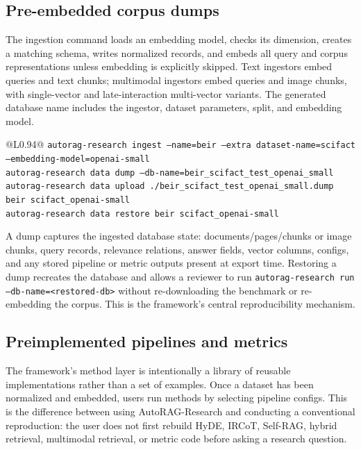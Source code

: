 \documentclass{article}
\newcommand{\framework}{AutoRAG-Research}
\begin{document}
\subsection{Pre-embedded corpus dumps}

The ingestion command loads an embedding model, checks its dimension, creates a matching schema, writes normalized records, and embeds all query and corpus representations unless embedding is explicitly skipped. Text ingestors embed queries and text chunks; multimodal ingestors embed queries and image chunks, with single-vector and late-interaction multi-vector variants. The generated database name includes the ingestor, dataset parameters, split, and embedding model.

\begin{center}
\small
\begin{tabular}{@{}L{0.94\linewidth}@{}}
\toprule
\texttt{autorag-research ingest --name=beir --extra dataset-name=scifact --embedding-model=openai-small} \\
\texttt{autorag-research data dump --db-name=beir\_scifact\_test\_openai\_small} \\
\texttt{autorag-research data upload ./beir\_scifact\_test\_openai\_small.dump beir scifact\_openai-small} \\
\texttt{autorag-research data restore beir scifact\_openai-small} \\
\bottomrule
\end{tabular}
\end{center}

A dump captures the ingested database state: documents/pages/chunks or image chunks, query records, relevance relations, answer fields, vector columns, configs, and any stored pipeline or metric outputs present at export time. Restoring a dump recreates the database and allows a reviewer to run \texttt{autorag-research run --db-name=<restored-db>} without re-downloading the benchmark or re-embedding the corpus. This is the framework's central reproducibility mechanism.


\subsection{Preimplemented pipelines and metrics}

The framework's method layer is intentionally a library of reusable implementations rather than a set of examples. Once a dataset has been normalized and embedded, users run methods by selecting pipeline configs. This is the difference between using \framework{} and conducting a conventional reproduction: the user does not first rebuild HyDE, IRCoT, Self-RAG, hybrid retrieval, multimodal retrieval, or metric code before asking a research question.
\end{document}
